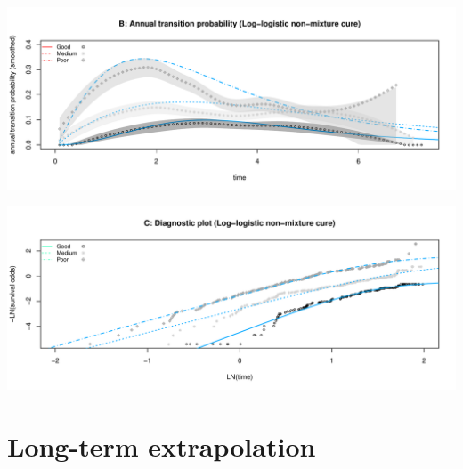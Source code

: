 \documentclass[]{article}
\begin{document}
\begin{flushleft}\includegraphics[height=0.25\textheight]{Images/cure_llog_nmix-2} \end{flushleft}

\begin{flushleft}\includegraphics[height=0.25\textheight]{Images/cure_llog_nmix-3} \end{flushleft}

\newpage

\section{Long-term extrapolation}\label{long-term-extrapolation}
\end{document}
